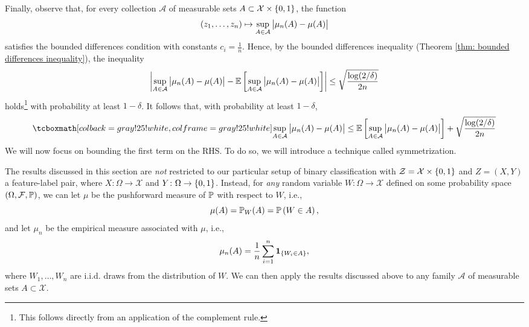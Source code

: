 Finally, observe that, for every collection $\mathcal{A}$ of measurable sets $A \subset \mathcal{X} \times \set{0, 1}$, the function
\[
    (z_1, \dots, z_n) \mapsto \sup_{A \in \mathcal{A}} \bigAbs{ \mu_n(A) - \mu(A) }
\]
satisfies the bounded differences condition with constants $c_i = \frac{1}{n}$. Hence, by the bounded differences inequality (Theorem \ref{thm: bounded differences inequality}), the inequality
\[
    \abs{ \sup_{A \in \mathcal{A}} \bigAbs{ \mu_n(A) - \mu(A) } - \Ex{\sup_{A \in \mathcal{A}} \bigAbs{ \mu_n(A) - \mu(A) }} } \leq \sqrt{\frac{\log(2 / \delta)}{2n}}
\]
holds\footnote{This follows directly from an application of the complement rule.} with probability at least $1 - \delta$. It follows that, with probability at least $1 - \delta$,
\begin{equation}
\label{eq: upper bound on uniform deviations}
    \highlightMath{
        \sup_{A \in \mathcal{A}} \bigAbs{ \mu_n(A) - \mu(A) } \leq \Ex{\sup_{A \in \mathcal{A}} \bigAbs{ \mu_n(A) - \mu(A) }} + \sqrt{\frac{\log(2 / \delta)}{2n}}
    }
\end{equation}
We will now focus on bounding the first term on the RHS. To do so, we will introduce a technique called symmetrization.

\begin{remark}
The results discussed in this section are \emph{not} restricted to our particular setup of binary classification with $\mathcal{Z} = \mathcal{X} \times \set{0, 1}$ and $Z = (X, Y)$ a feature-label pair, where $X \colon \Omega \to \mathcal{X}$ and $Y \colon \Omega \to \set{0 ,1}$. Instead, for \emph{any} random variable $W \colon \Omega \to \mathcal{X}$ defined on some probability space $(\Omega, \mathcal{F}, \P)$, we can let $\mu$ be the pushforward measure of $\P$ with respect to $W$, i.e.,
\[
    \mu(A) = \P_W(A) = \Pr{W \in A},
\]
and let $\mu_n$ be the empirical measure associated with $\mu$, i.e.,
\[
    \mu_n(A) = \frac{1}{n} \sum_{i=1}^n \indSet{W_i \in A},
\]
where $W_1, \dots, W_n$ are i.i.d. draws from the distribution of $W$. We can then apply the results discussed above to any family $\mathcal{A}$ of measurable sets $A \subset \mathcal{X}$.
\end{remark}
